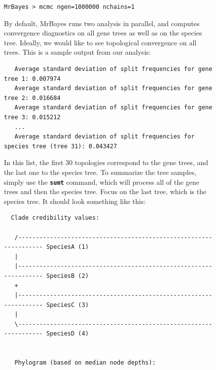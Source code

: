 \documentclass[12pt]{book}
\newcommand{\ttt}[1]{\texttt{#1}}
\newcommand{\tb}[1]{\ttt{\textbf{#1}}}
\begin{document}
\begin{figure}[h]
\begin{singlespacing}
\small
\begin{verbatim}
MrBayes > mcmc ngen=1000000 nchains=1
\end{verbatim}
\end{singlespacing}
\normalsize

By default, MrBayes runs two analysis in parallel, and computes convergence diagnostics on all gene
trees as well as on the species tree. Ideally, we would like to see topological convergence on all
trees. This is a sample output from our analysis:

\footnotesize
\begin{singlespacing}
\begin{verbatim}
   Average standard deviation of split frequencies for gene tree 1: 0.007974
   Average standard deviation of split frequencies for gene tree 2: 0.016684
   Average standard deviation of split frequencies for gene tree 3: 0.015212
   ...
   Average standard deviation of split frequencies for species tree (tree 31): 0.043427
\end{verbatim}
\end{singlespacing}
\normalsize

In this list, the first 30 topologies correspond to the gene trees, and the last one to the species
tree. To summarize the tree samples, simply use the \tb{sumt} command, which will process all of
the gene trees and then the species tree. Focus on the last tree, which is the species tree. It
should look something like this:

\scriptsize
\begin{singlespacing}
\begin{verbatim}
  Clade credibility values:
 
   /------------------------------------------------------------------ SpeciesA (1)
   |                                                                               
   |------------------------------------------------------------------ SpeciesB (2)
   +                                                                               
   |------------------------------------------------------------------ SpeciesC (3)
   |                                                                               
   \------------------------------------------------------------------ SpeciesD (4)
                                                                                   

   Phylogram (based on median node depths):


\end{verbatim}
\end{singlespacing}
\end{figure}
\end{document}
